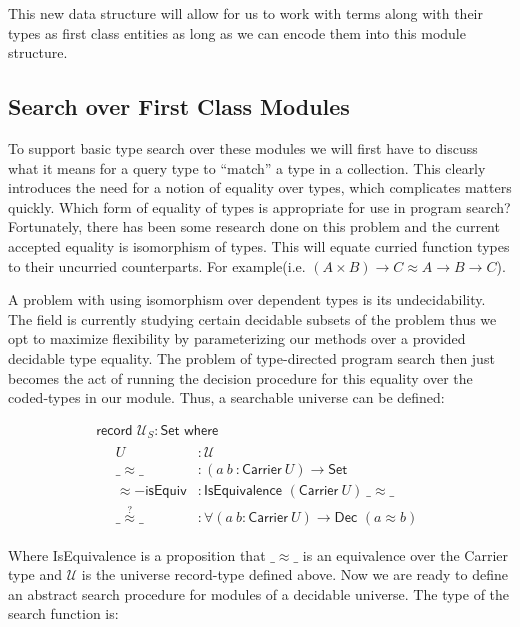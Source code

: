 \documentclass[acmsmall,review,authorversion]{acmart}
\newcommand{\term}[1]{\textsf{#1}}
\newcommand{\type}[1]{\textsf{#1}}
\newcommand{\Carrier}{\term{Carrier}}
\newcommand{\Universe}{\mathcal{U}}
\newcommand{\Set}{\type{Set}}
\newcommand{\?}{\stackrel{?}{\approx}}
\newcommand{\record}[2]{\textsf{record } #1 : #2 \textsf{ where}}
\begin{document}
This new data structure will allow for us to work with terms along with their
types as first class entities as long as we can encode them into this module
structure.


\subsection{Search over First Class Modules}


To support basic type search over these modules we will first have to discuss
what it means for a query type to ``match'' a type in a collection. This clearly
introduces the need for a notion of equality over types, which complicates
matters quickly. Which form of equality of types is appropriate for use in
program search? Fortunately, there has been some research done on this problem
and the current accepted equality is isomorphism of
types\cite{dicosmo2012isomorphisms}. This will equate curried function types to
their uncurried counterparts. For example(i.e. $(A \times B) \rightarrow C
\approx A \rightarrow B \rightarrow C$).

A problem with using isomorphism over dependent types is its
undecidability\cite{HoTT}. The field is currently studying certain decidable
subsets of the problem thus we opt to maximize flexibility by parameterizing our
methods over a provided decidable type equality. The problem of type-directed
program search then just becomes the act of running the decision procedure for
this equality over the coded-types in our module. Thus, a searchable universe
can be defined:

$$
\begin{array}{l}
  \record{\Universe_S}{\Set}\\
  \quad \begin{array}{ll}
          U &: \Universe\\
         \_\approx\_ &: (a\ b\ : \Carrier\ U) \rightarrow \Set\\
         \approx-\textsf{isEquiv} &: \textsf{IsEquivalence } (\Carrier\ U)\ \_\approx\_\\
         \_\?\_ &: \forall (a\ b : \Carrier\ U) \rightarrow \textsf{Dec } (a \approx b)
        \end{array}
\end{array}
$$

Where \textsf{IsEquivalence} is a proposition that $\_\approx\_$ is an
equivalence over the \textsf{Carrier} type and $\Universe$ is the universe
record-type defined above. Now we are ready to define an abstract search
procedure for modules of a decidable universe. The type of the search function
is:
\end{document}
